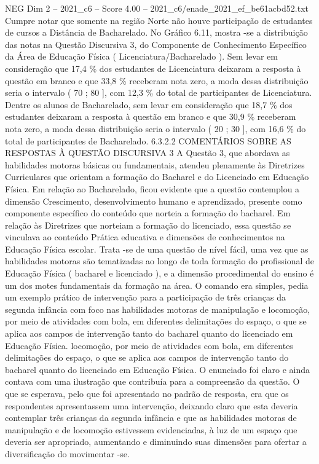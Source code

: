 \begin{textsample}{NEG Dim 2 – 2021\_c6 – Score 4.00 – 2021\_c6/enade\_2021\_ef\_be61acbd52.txt}
Cumpre notar que somente na região Norte não houve participação de estudantes de cursos a Distância de Bacharelado.
No Gráfico 6.11, mostra -se a distribuição das notas na Questão Discursiva 3, do Componente de Conhecimento Específico da Área de Educação Física ( Licenciatura/Bacharelado ).
Sem levar em consideração que 17,4 \% dos estudantes de Licenciatura deixaram a resposta à questão em branco e que 33,8 \% receberam nota zero, a moda dessa distribuição seria o intervalo ( 70 ; 80 ], com 12,3 \% do total de participantes de Licenciatura.
Dentre os alunos de Bacharelado, sem levar em consideração que 18,7 \% dos estudantes deixaram a resposta à questão em branco e que 30,9 \% receberam nota zero, a moda dessa distribuição seria o intervalo ( 20 ; 30 ], com 16,6 \% do total de participantes de Bacharelado. 6.3.2.2 COMENTÁRIOS SOBRE AS RESPOSTAS À QUESTÃO DISCURSIVA 3 A Questão 3, que abordava as habilidades motoras básicas ou fundamentais, atendeu plenamente às Diretrizes Curriculares que orientam a formação do Bacharel e do Licenciado em Educação Física.
Em relação ao Bacharelado, ficou evidente que a questão contemplou a dimensão Crescimento, desenvolvimento humano e aprendizado, presente como componente específico do conteúdo que norteia a formação do bacharel.
Em relação às Diretrizes que norteiam a formação do licenciado, essa questão se vinculava ao conteúdo Prática educativa e dimensões de conhecimentos na Educação Física escolar.
Trata -se de uma questão de nível fácil, uma vez que as habilidades motoras são tematizadas ao longo de toda formação do profissional de Educação Física ( bacharel e licenciado ), e a dimensão procedimental do ensino é um dos motes fundamentais da formação na área.
O comando era simples, pedia um exemplo prático de intervenção para a participação de três crianças da segunda infância com foco nas habilidades motoras de manipulação e locomoção, por meio de atividades com bola, em diferentes delimitações do espaço, o que se aplica aos campos de intervenção tanto do bacharel quanto do licenciado em Educação Física. locomoção, por meio de atividades com bola, em diferentes delimitações do espaço, o que se aplica aos campos de intervenção tanto do bacharel quanto do licenciado em Educação Física.
O enunciado foi claro e ainda contava com uma ilustração que contribuía para a compreensão da questão.
O que se esperava, pelo que foi apresentado no padrão de resposta, era que os respondentes apresentassem uma intervenção, deixando claro que esta deveria contemplar três crianças da segunda infância e que as habilidades motoras de manipulação e de locomoção estivessem evidenciadas, à luz de um espaço que deveria ser apropriado, aumentando e diminuindo suas dimensões para ofertar a diversificação do movimentar -se.

\end{textsample}
